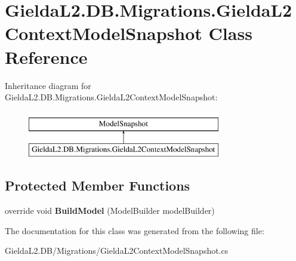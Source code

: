 \hypertarget{class_gielda_l2_1_1_d_b_1_1_migrations_1_1_gielda_l2_context_model_snapshot}{}\section{Gielda\+L2.\+D\+B.\+Migrations.\+Gielda\+L2\+Context\+Model\+Snapshot Class Reference}
\label{class_gielda_l2_1_1_d_b_1_1_migrations_1_1_gielda_l2_context_model_snapshot}
Inheritance diagram for Gielda\+L2.\+D\+B.\+Migrations.\+Gielda\+L2\+Context\+Model\+Snapshot\+:\begin{figure}[H]
\begin{center}
\leavevmode
\includegraphics[height=2.000000cm]{class_gielda_l2_1_1_d_b_1_1_migrations_1_1_gielda_l2_context_model_snapshot}
\end{center}
\end{figure}
\subsection*{Protected Member Functions}
\begin{DoxyCompactItemize}
\item 
\mbox{\label{class_gielda_l2_1_1_d_b_1_1_migrations_1_1_gielda_l2_context_model_snapshot_acb922b409c26a039f0365e1fd7d042e6}} 
override void {\bfseries Build\+Model} (Model\+Builder model\+Builder)
\end{DoxyCompactItemize}


The documentation for this class was generated from the following file\+:\begin{DoxyCompactItemize}
\item 
Gielda\+L2.\+D\+B/\+Migrations/Gielda\+L2\+Context\+Model\+Snapshot.\+cs\end{DoxyCompactItemize}
